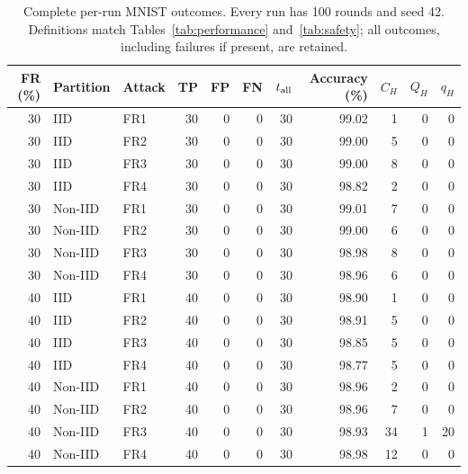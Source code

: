 \begin{table}[t]
\centering\footnotesize\setlength{\tabcolsep}{4pt}
\caption{Complete per-run MNIST outcomes. Every run has 100 rounds and seed 42. Definitions match Tables~\ref{tab:performance} and~\ref{tab:safety}; all outcomes, including failures if present, are retained.}\label{tab:detail-mnist}
\begin{tabular}{rllrrrrrrrr}
\toprule
FR (\%) & Partition & Attack & TP & FP & FN & $t_{\rm all}$ & Accuracy (\%) & $C_H$ & $Q_H$ & $q_H$ \\
\midrule
30 & IID & FR1 & 30 & 0 & 0 & 30 & 99.02 & 1 & 0 & 0 \\
30 & IID & FR2 & 30 & 0 & 0 & 30 & 99.00 & 5 & 0 & 0 \\
30 & IID & FR3 & 30 & 0 & 0 & 30 & 99.00 & 8 & 0 & 0 \\
30 & IID & FR4 & 30 & 0 & 0 & 30 & 98.82 & 2 & 0 & 0 \\
30 & Non-IID & FR1 & 30 & 0 & 0 & 30 & 99.01 & 7 & 0 & 0 \\
30 & Non-IID & FR2 & 30 & 0 & 0 & 30 & 99.00 & 6 & 0 & 0 \\
30 & Non-IID & FR3 & 30 & 0 & 0 & 30 & 98.98 & 8 & 0 & 0 \\
30 & Non-IID & FR4 & 30 & 0 & 0 & 30 & 98.96 & 6 & 0 & 0 \\
40 & IID & FR1 & 40 & 0 & 0 & 30 & 98.90 & 1 & 0 & 0 \\
40 & IID & FR2 & 40 & 0 & 0 & 30 & 98.91 & 5 & 0 & 0 \\
40 & IID & FR3 & 40 & 0 & 0 & 30 & 98.85 & 5 & 0 & 0 \\
40 & IID & FR4 & 40 & 0 & 0 & 30 & 98.77 & 5 & 0 & 0 \\
40 & Non-IID & FR1 & 40 & 0 & 0 & 30 & 98.96 & 2 & 0 & 0 \\
40 & Non-IID & FR2 & 40 & 0 & 0 & 30 & 98.96 & 7 & 0 & 0 \\
40 & Non-IID & FR3 & 40 & 0 & 0 & 30 & 98.93 & 34 & 1 & 20 \\
40 & Non-IID & FR4 & 40 & 0 & 0 & 30 & 98.98 & 12 & 0 & 0 \\
\bottomrule
\end{tabular}

\end{table}


